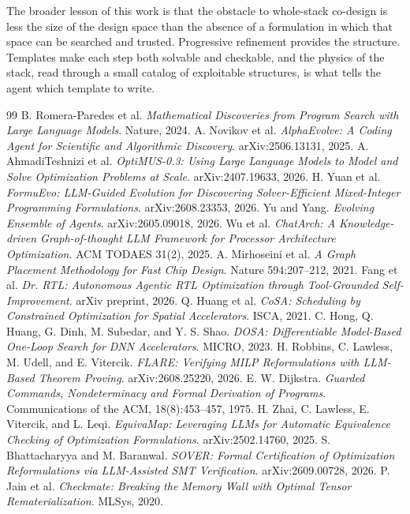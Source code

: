 \documentclass[11pt]{article}
\begin{document}
The broader lesson of this work is that the obstacle to whole-stack co-design is less the size of the design space than the absence of a formulation in which that space can be searched and trusted. Progressive refinement provides the structure. Templates make each step both solvable and checkable, and the physics of the stack, read through a small catalog of exploitable structures, is what tells the agent which template to write.

\begin{thebibliography}{99}
\small
{} B. Romera-Paredes et al. \emph{Mathematical Discoveries from Program Search with Large Language Models}. Nature, 2024.
 A. Novikov et al. \emph{AlphaEvolve: A Coding Agent for Scientific and Algorithmic Discovery}. arXiv:2506.13131, 2025.
 A. AhmadiTeshnizi et al. \emph{OptiMUS-0.3: Using Large Language Models to Model and Solve Optimization Problems at Scale}. arXiv:2407.19633, 2026.
 H. Yuan et al. \emph{FormuEvo: LLM-Guided Evolution for Discovering Solver-Efficient Mixed-Integer Programming Formulations}. arXiv:2608.23353, 2026.
 Yu and Yang. \emph{Evolving Ensemble of Agents}. arXiv:2605.09018, 2026.
 Wu et al. \emph{ChatArch: A Knowledge-driven Graph-of-thought LLM Framework for Processor Architecture Optimization}. ACM TODAES 31(2), 2025.
 A. Mirhoseini et al. \emph{A Graph Placement Methodology for Fast Chip Design}. Nature 594:207--212, 2021.
 Fang et al. \emph{Dr. RTL: Autonomous Agentic RTL Optimization through Tool-Grounded Self-Improvement}. arXiv preprint, 2026.
 Q. Huang et al. \emph{CoSA: Scheduling by Constrained Optimization for Spatial Accelerators}. ISCA, 2021.
 C. Hong, Q. Huang, G. Dinh, M. Subedar, and Y. S. Shao. \emph{DOSA: Differentiable Model-Based One-Loop Search for DNN Accelerators}. MICRO, 2023.
 H. Robbins, C. Lawless, M. Udell, and E. Vitercik. \emph{FLARE: Verifying MILP Reformulations with LLM-Based Theorem Proving}. arXiv:2608.25220, 2026.
 E. W. Dijkstra. \emph{Guarded Commands, Nondeterminacy and Formal Derivation of Programs}. Communications of the ACM, 18(8):453--457, 1975.
 H. Zhai, C. Lawless, E. Vitercik, and L. Leqi. \emph{EquivaMap: Leveraging LLMs for Automatic Equivalence Checking of Optimization Formulations}. arXiv:2502.14760, 2025.
 S. Bhattacharyya and M. Baranwal. \emph{SOVER: Formal Certification of Optimization Reformulations via LLM-Assisted SMT Verification}. arXiv:2609.00728, 2026.
 P. Jain et al. \emph{Checkmate: Breaking the Memory Wall with Optimal Tensor Rematerialization}. MLSys, 2020.

\end{thebibliography}
\end{document}
